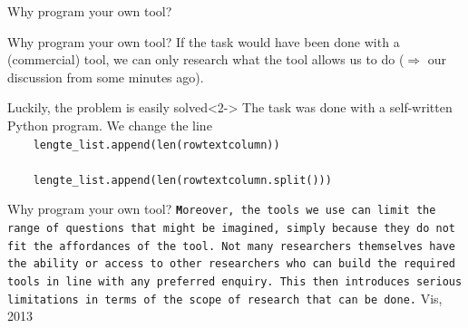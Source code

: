 \documentclass{beamer}
\begin{document}
\begin{frame}{Why program your own tool?}
\end{frame}

\begin{frame}{Why program your own tool?}
If the task would have been done with a (commercial) tool, we can only research what the tool allows us to do ($\Rightarrow$ our discussion from some minutes ago).
\begin{block}{Luckily, the problem is easily solved}<2->
The task was done with a self-written Python program. We change the line\\
\tt{~~~~lengte\_list.append(len(row\lbrack textcolumn\rbrack))}
\\ \\
\tt{~~~~lengte\_list.append(len(row\lbrack textcolumn\rbrack.split()))}
\end{block}
\end{frame}

\begin{frame}{Why program your own tool?}
\vspace{1cm}
{\tt \textbf
Moreover, the tools we use can limit the range of questions that might be imagined, simply because they do not fit the affordances of the tool. Not many researchers themselves have the ability or access to other researchers who can build the required tools in line with any preferred enquiry. This then introduces serious limitations in terms of the scope of research that can be done.}
\vspace{1cm}
\footnotesize{Vis, 2013\\}

\end{frame}
\end{document}
